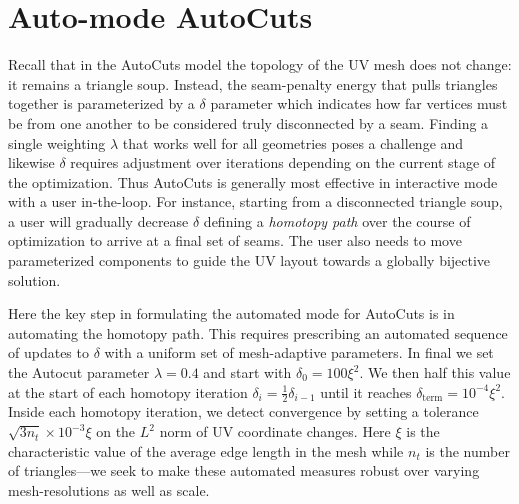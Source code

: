 \appendix

\section{Auto-mode AutoCuts}
\label{app:autoauto}

Recall that in the AutoCuts model the topology of the UV mesh does not change: it remains a triangle soup. Instead, the seam-penalty energy that pulls triangles together is parameterized by a $\delta$ parameter which indicates how far vertices must be from one another to be considered truly disconnected by a seam. Finding a single weighting $\lambda$ that works well for all geometries poses a challenge and likewise $\delta$ requires adjustment over iterations depending on the current stage of the optimization. Thus AutoCuts is generally most effective in interactive mode with a user in-the-loop. For instance, starting from a disconnected triangle soup, a user will gradually decrease $\delta$ defining a {\em homotopy path} over the course of optimization to arrive at a final set of seams. The user also needs to move parameterized components to guide the UV layout towards a globally bijective solution. 

Here the key step in formulating the automated mode for AutoCuts is in automating the homotopy path. This requires prescribing an automated sequence of updates to $\delta$ with a uniform set of mesh-adaptive parameters. In final we set the Autocut parameter $\lambda = 0.4$ and start with $\delta_0=100\xi^2$. We then half this value at the start of each homotopy iteration $\delta_i = \frac{1}{2}\delta_{i-1}$ until it reaches $\delta_\text{term}=10^{-4}\xi^2$. Inside each homotopy iteration, we detect convergence by setting a tolerance $\sqrt{3n_t}\times10^{-3}\xi$ on the $L^2$ norm of UV coordinate changes. Here $\xi$ is the characteristic value of the average edge length in the mesh while $n_t$ is the number of triangles---we seek to make these automated measures robust over varying mesh-resolutions as well as scale.